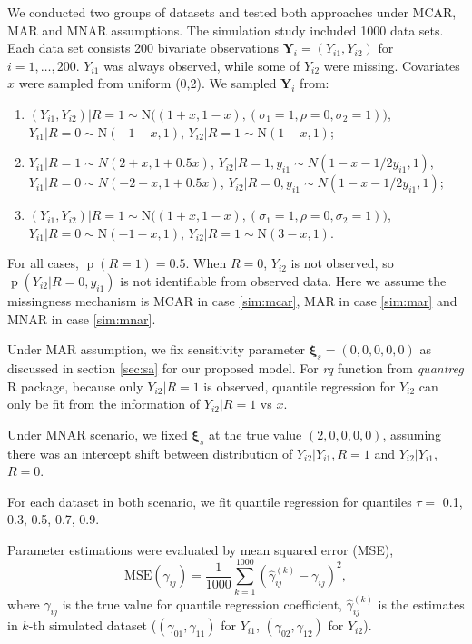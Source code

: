 \documentclass[12pt]{article}
\DeclareMathOperator{\pr}{p}
\begin{document}
We conducted two groups of datasets and tested both approaches under
MCAR, MAR and MNAR assumptions. The simulation study included 1000
data sets. Each data set consists 200 bivariate observations $\bm Y_i
= (Y_{i1}, Y_{i2})$ for $i = 1, \ldots, 200$. $Y_{i1}$ was always
observed, while some of $Y_{i2}$ were missing. Covariates $x$ were
sampled from uniform (0,2). We sampled $\bm Y_i$ from:

\begin{enumerate}
\item \label{sim:mcar} $ ( Y_{i1}, Y_{i2}) |R = 1 \sim \textrm{N}
  \big( (1 + x, 1 - x), (\sigma_1 = 1, \rho = 0 , \sigma_2 = 1)
  \big)$, $ Y_{i1} | R = 0 \sim \textrm{N}(-1-x, 1) $, $ Y_{i2} | R =
  1 \sim \textrm{N}(1-x, 1) $;

\item \label{sim:mar} $ Y_{i1} |R = 1 \sim N ( 2 + x, 1 + 0.5x)$, $
  Y_{i2} | R = 1, y_{i1} \sim N(1 - x - 1/2y_{i1}, 1) $, $ Y_{i1}| R=
  0 \sim N(-2 - x, 1 + 0.5x) $, $ Y_{i2}| R= 0, y_{i1} \sim N(1 - x -
  1/2y_{i1}, 1)$;

\item \label{sim:mnar} $ ( Y_{i1}, Y_{i2}) |R = 1 \sim \textrm{N}
  \big( ( 1 + x, 1 - x), (\sigma_1 = 1, \rho = 0 , \sigma_2 = 1)
  \big)$, $ Y_{i1} | R = 0 \sim \textrm{N}(-1-x, 1) $, $ Y_{i2} | R =
  1 \sim \textrm{N}(3-x, 1) $.
\end{enumerate}

For all cases, $\pr (R = 1) = 0.5$.  When $R = 0$, $Y_{i2}$ is not
observed, so $\pr(Y_{i2}| R = 0, y_{i1})$ is not identifiable from
observed data. Here we assume the missingness mechanism is MCAR in
case \ref{sim:mcar}, MAR in case \ref{sim:mar} and MNAR in case
\ref{sim:mnar}.

Under MAR assumption, we fix sensitivity parameter $\bm \xi_s =
(0,0,0,0,0)$ as discussed in section \ref{sec:sa} for our proposed
model. For \textit{rq} function from \textit{quantreg} R package,
because only $Y_{i2}| R = 1$ is observed, quantile regression for
$Y_{i2}$ can only be fit from the information of $Y_{i2}|R = 1$ vs
$x$.

Under MNAR scenario, we fixed $\bm \xi_s$ at the true value $(2, 0, 0,
0, 0)$, assuming there was an intercept shift between distribution of
$Y_{i2}|Y_{i1}, R = 1$ and $Y_{i2}|Y_{i1}$, $R = 0$.

For each dataset in both scenario, we fit quantile regression for
quantiles $\tau =$ 0.1, 0.3, 0.5, 0.7, 0.9.

Parameter estimations were evaluated by mean squared error (MSE),
\begin{equation*}
  \text{MSE} (\gamma_{ij}) = \frac{1}{1000} \sum_{k = 1}^{1000}
  \left( \hat{\gamma}_{ij}^{(k)}  - \gamma_{ij}\right)^2,
\end{equation*}
where $\gamma_{ij}$ is the true value for quantile regression
coefficient, $\hat{\gamma}_{ij}^{(k)}$ is the estimates in $k$-th
simulated dataset ($(\gamma_{01}, \gamma_{11})$ for $Y_{i1}$,
$(\gamma_{02}, \gamma_{12})$ for $Y_{i2}$).
\end{document}

